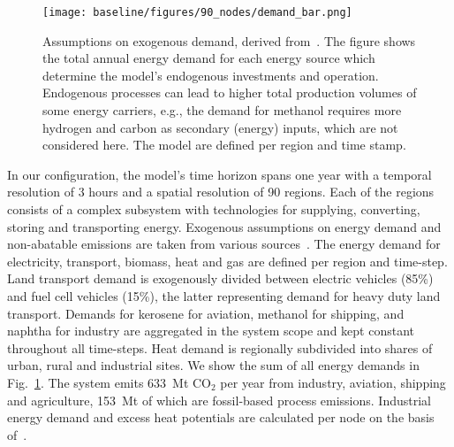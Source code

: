 \documentclass[twocolumn]{article}
\newcommand{\COtwo}{CO$_2$}
\begin{document}
\begin{figure}
    \texttt{[image: baseline/figures/90\_nodes/demand\_bar.png]}
    \caption{Assumptions on exogenous demand, derived from~\cite{piamanzGeoreferencedIndustrialSites2018,muehlenpfordtTimeSeries2019,mantzosJRCIDEES20152018,NationalEmissionsReported2023,EurostatCompleteEnergyBalance,uwekrienDemandlib2023}. The figure shows the total annual energy demand for each energy source which determine the model's endogenous investments and operation. Endogenous processes can lead to higher total production volumes of some energy carriers, e.g., the demand for methanol requires more hydrogen and carbon as secondary (energy) inputs, which are not considered here. The model are defined per region and time stamp.}
    \label{fig:total-demand-bar}
\end{figure}
%
In our configuration, the model's time horizon spans one year with a temporal resolution of 3 hours and a spatial resolution of 90 regions. Each of the regions consists of a complex subsystem with technologies for supplying, converting, storing and transporting energy. Exogenous assumptions on energy demand and non-abatable emissions are taken from various sources~\cite{piamanzGeoreferencedIndustrialSites2018,muehlenpfordtTimeSeries2019,mantzosJRCIDEES20152018,NationalEmissionsReported2023,EurostatCompleteEnergyBalance,uwekrienDemandlib2023}. The energy demand for electricity, transport, biomass, heat and gas are defined per region and time-step.
Land transport demand is exogenously divided between electric vehicles (85\%) and fuel cell vehicles (15\%), the latter representing demand for heavy duty land transport. Demands for kerosene for aviation, methanol for shipping, and naphtha for industry are aggregated in the system scope and kept constant throughout all time-steps. Heat demand is regionally subdivided into shares of urban, rural and industrial sites. We show the sum of all energy demands in Fig.~\ref{fig:total-demand-bar}. The system emits 633~Mt \COtwo{} per year from industry, aviation, shipping and agriculture, 153~Mt of which are fossil-based process emissions. Industrial energy demand and excess heat potentials are calculated per node on the basis of~\cite{hotmaps_industrial_db}.
\end{document}
